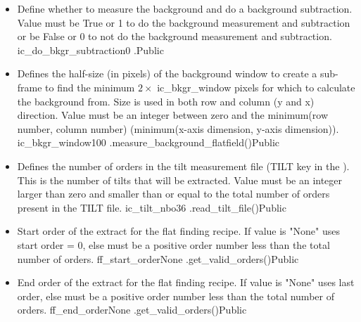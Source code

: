 \begin{itemize}

\item {}
{Define whether to measure the background and do a background subtraction. Value must be True or 1 to do the background measurement and subtraction or be False or 0 to not do the background measurement and subtraction.}
{ic\_do\_bkgr\_subtraction}{0}
{\calFFraw}{\constantsfile}{\calFFraw.\progMAIN}{Public}


\item {}
{Defines the half-size (in pixels) of the background window to create a sub-frame to find the minimum $2\times$ ic\_bkgr\_window pixels for which to calculate the background from. Size is used in both row and column (y and x) direction. Value must be an integer between zero and the minimum(row number, column number) (minimum(x-axis dimension, y-axis dimension)).}
{ic\_bkgr\_window}{100}
{\calFFraw}{\constantsfile}{\spirouBACK.measure\_background\_flatfield()}{Public}


\item {}
{Defines the number of orders in the tilt measurement file (TILT key in the \masterCALIBDBfile). This is the number of tilts that will be extracted. Value must be an integer larger than zero and smaller than or equal to the total number of orders present in the TILT file.}
{ic\_tilt\_nbo}{36}
{\calFFraw}{\constantsfile}{\spirouFITS.read\_tilt\_file()}{Public}


\item {}
{Start order of the extract for the flat finding recipe. If value is "None" uses start order = 0, else must be a positive order number less than the total number of orders.}
{ff\_start\_order}{None}
{\calFFraw}{\constantsfile}{\spirouFLAT.get\_valid\_orders()}{Public}


\item {}
{End order of the extract for the flat finding recipe. If value is "None" uses last order, else must be a positive order number less than the total number of orders.}
{ff\_end\_order}{None}
{\calFFraw}{\constantsfile}{\spirouFLAT.get\_valid\_orders()}{Public}



\end{itemize}

